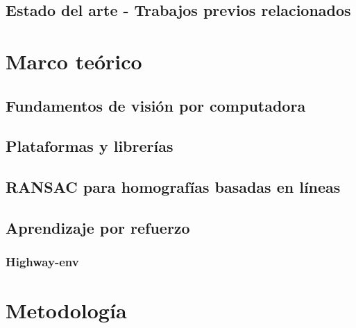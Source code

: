 \documentclass[10pt,letterpaper,final]{article}
\begin{document}
\subsection{Estado del arte - Trabajos previos relacionados}


% 

\clearpage
\section{Marco teórico}\label{chap:marco-teorico}


\subsection{Fundamentos de visión por computadora}\label{sec:vision}


\subsection{Plataformas y librerías}\label{sec:plataformas}


\subsection{RANSAC para homografías basadas en líneas}\label{sec:ransac-teorico}


\subsection{Aprendizaje por refuerzo}


\subsubsection{Highway-env}


\clearpage
\section{Metodología}\label{chap:metodologia}

\end{document}
